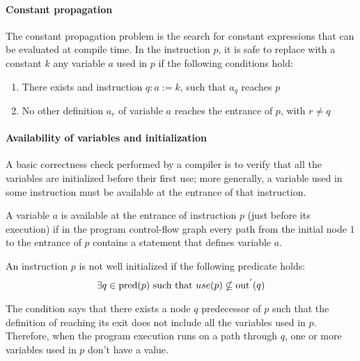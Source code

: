 \paragraph*{Constant propagation}
The constant propagation problem is the search for constant expressions that can be evaluated at compile time.
In the instruction $p$, it is safe to replace with a constant $k$ any variable $a$ used in $p$ if the following conditions hold:
\begin{enumerate}
    \item There exists and instruction $q : a := k$, such that $a_q$ reaches $p$
    \item No other definition $a_r$ of variable $a$ reaches the entrance of $p$, with $r \neq q$
\end{enumerate}

\paragraph*{Availability of variables and initialization}
A basic correctness check performed by a compiler is to verify that all the variables are initialized before their first use;
more generally, a variable used in some instruction must be available at the entrance of that instruction.
\begin{definition}
  A variable $a$ is available at the entrance of instruction $p$ (just before its execution) if in the program control-flow graph every path from the initial node $1$ to the entrance of $p$ contains a statement that defines variable $a$.
\end{definition}
\begin{definition}
    An instruction $p$ is not well initialized if the following predicate holds:
    \[ \exists q \in \text{pred}(p) \textnormal{ such that } use(p) \nsubseteq \text{out}^{'}(q) \]
\end{definition}
The condition says that there exists a node $q$ predecessor of $p$ such that the definition of reaching its exit does not include all the variables used in $p$.
Therefore, when the program execution runs on a path through $q$, one or more variables used in $p$ don't have a value.